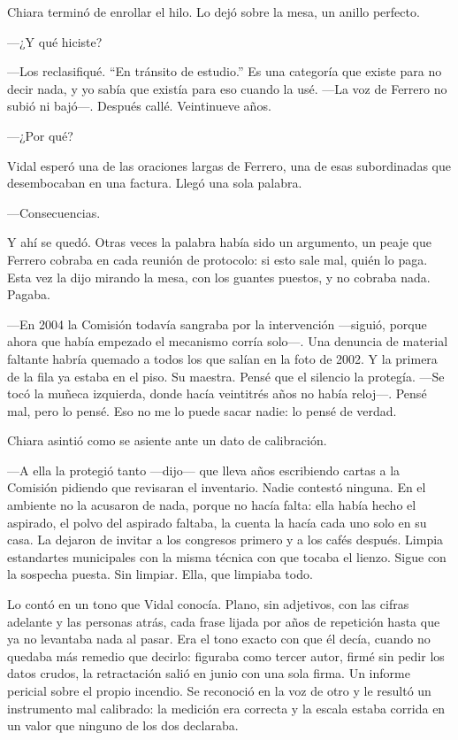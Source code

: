 Chiara terminó de enrollar el hilo. Lo dejó sobre la mesa, un anillo perfecto.

---¿Y qué hiciste?

---Los reclasifiqué. ``En tránsito de estudio.'' Es una categoría que existe para no decir nada, y yo sabía que existía para eso cuando la usé. ---La voz de Ferrero no subió ni bajó---. Después callé. Veintinueve años.

---¿Por qué?

Vidal esperó una de las oraciones largas de Ferrero, una de esas subordinadas que desembocaban en una factura. Llegó una sola palabra.

---Consecuencias.

Y ahí se quedó. Otras veces la palabra había sido un argumento, un peaje que Ferrero cobraba en cada reunión de protocolo: si esto sale mal, quién lo paga. Esta vez la dijo mirando la mesa, con los guantes puestos, y no cobraba nada. Pagaba.

---En 2004 la Comisión todavía sangraba por la intervención ---siguió, porque ahora que había empezado el mecanismo corría solo---. Una denuncia de material faltante habría quemado a todos los que salían en la foto de 2002. Y la primera de la fila ya estaba en el piso. Su maestra. Pensé que el silencio la protegía. ---Se tocó la muñeca izquierda, donde hacía veintitrés años no había reloj---. Pensé mal, pero lo pensé. Eso no me lo puede sacar nadie: lo pensé de verdad.

Chiara asintió como se asiente ante un dato de calibración.

---A ella la protegió tanto ---dijo--- que lleva años escribiendo cartas a la Comisión pidiendo que revisaran el inventario. Nadie contestó ninguna. En el ambiente no la acusaron de nada, porque no hacía falta: ella había hecho el aspirado, el polvo del aspirado faltaba, la cuenta la hacía cada uno solo en su casa. La dejaron de invitar a los congresos primero y a los cafés después. Limpia estandartes municipales con la misma técnica con que tocaba el lienzo. Sigue con la sospecha puesta. Sin limpiar. Ella, que limpiaba todo.

Lo contó en un tono que Vidal conocía. Plano, sin adjetivos, con las cifras adelante y las personas atrás, cada frase lijada por años de repetición hasta que ya no levantaba nada al pasar. Era el tono exacto con que él decía, cuando no quedaba más remedio que decirlo: figuraba como tercer autor, firmé sin pedir los datos crudos, la retractación salió en junio con una sola firma. Un informe pericial sobre el propio incendio. Se reconoció en la voz de otro y le resultó un instrumento mal calibrado: la medición era correcta y la escala estaba corrida en un valor que ninguno de los dos declaraba.

